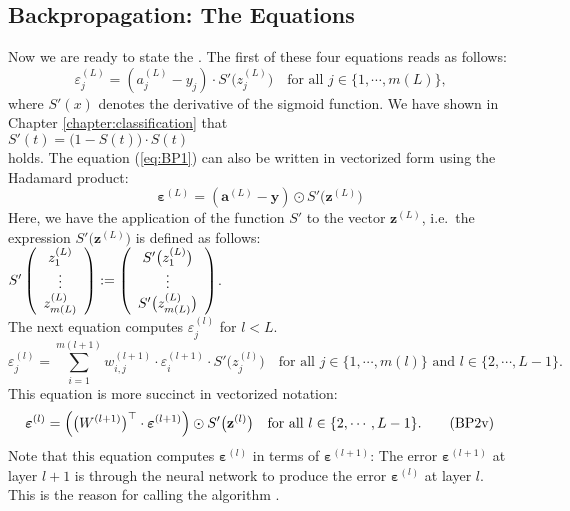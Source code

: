 \subsection{Backpropagation: The Equations}
Now we are ready to state the .  The first of these four equations reads as follows:
\begin{equation}
  \label{eq:BP1}
  \varepsilon^{(L)}_j = (a_j^{(L)} - y_j) \cdot S'\bigl(z_j^{(L)}\bigr)
 \quad \mbox{for all $j \in \{1, \cdots, m(L)\}$,}
  \tag{BP1}
\end{equation}
where $S'(x)$ denotes the derivative of the sigmoid function.  We have shown in Chapter
\ref{chapter:classification} that
\\[0.2cm]
\hspace*{1.3cm}
$S'(t) = \bigl(1 - S(t)\bigr) \cdot S(t)$
\\[0.2cm]
holds.  The equation (\ref{eq:BP1}) can also be written in vectorized form using the Hadamard product:
\begin{equation}
  \label{eq:BP1s}
\boldsymbol{\varepsilon}^{(L)} = (\mathbf{a}^{(L)} - \mathbf{y}) \odot S'\bigl(\mathbf{z}^{(L)}\bigr)  
\tag{BP1v}
\end{equation}
Here, we have  the application of the function $S'$ to the vector $\mathbf{z}^{(L)}$, i.e.~the
expression $S'\bigl(\mathbf{z}^{(L)}\bigr)$ is defined as follows:
\\[0.2cm]
\hspace*{1.3cm}
$ S'\left(
  \begin{array}[c]{c}
   z_1^{(L)}      \\
   \vdots       \\
   z_{m(L)}^{(L)} 
  \end{array}
  \right) := \left(
  \begin{array}[c]{c}
   S'\bigl(z_1^{(L)}\bigr)      \\
   \vdots       \\
   S'\bigl(z_{m(L)}^{(L)}\bigr)
  \end{array}
  \right)
$.
\\[0.2cm]
The next equation computes $\varepsilon_j^{(l)}$ for $l < L$.  
\begin{equation}
  \label{eq:BP2}
  \varepsilon^{(l)}_j = \sum\limits_{i=1}^{m(l+1)} w_{i,j}^{(l+1)} \cdot \varepsilon^{(l+1)}_i \cdot
  S'\bigl(z^{(l)}_j\bigr) \quad \mbox{for all $j \in \{1, \cdots, m(l)\}$ and $l \in \{2, \cdots, L-1\}$}.
  \tag{BP2}
\end{equation}
This equation is more succinct in vectorized notation:
\begin{equation}
  \label{eq:BP2v}
  \boldsymbol{\varepsilon}^{(l)} = \Bigl(\bigl(W^{(l+1)}\bigr)^\top \cdot \boldsymbol{\varepsilon}^{(l+1)}\Bigr) \odot
  S'\bigl(\mathbf{z}^{(l)}\bigr) \quad \mbox{for all $l \in \{2, \cdots, L-1\}$}.
  \tag{BP2v}
\end{equation}
Note that this equation computes $\boldsymbol{\varepsilon}^{(l)}$ in terms of  $\boldsymbol{\varepsilon}^{(l+1)}$:  The error 
$\boldsymbol{\varepsilon}^{(l+1)}$ at layer $l+1$ is  through the neural network to produce the
error $\boldsymbol{\varepsilon}^{(l)}$ at layer $l$.  This is the reason for calling the algorithm .

